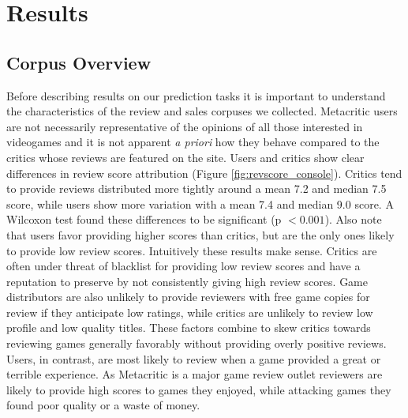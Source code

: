 \documentclass[letterpaper]{article}
\begin{document}


\section{Results}

\subsection{Corpus Overview}
Before describing results on our prediction tasks it is important to understand the characteristics of the review and sales corpuses we collected. Metacritic users are not necessarily representative of the opinions of all those interested in videogames and it is not apparent \textit{a priori} how they behave compared to the critics whose reviews are featured on the site.
Users and critics show clear differences in review score attribution (Figure \ref{fig:revscore_console}). Critics tend to provide reviews distributed more tightly around a mean 7.2 and median 7.5 score, while users show more variation with a mean 7.4 and median 9.0 score. A Wilcoxon test found these differences to be significant (p $< 0.001$). Also note that users favor providing higher scores than critics, but are the only ones likely to provide low review scores.
Intuitively these results make sense. Critics are often under threat of blacklist for providing low review scores and have a reputation to preserve by not consistently giving high review scores. Game distributors are also unlikely to provide reviewers with free game copies for review if they anticipate low ratings, while critics are unlikely to review low profile and low quality titles. These factors combine to skew critics towards reviewing games generally favorably without providing overly positive reviews. Users, in contrast, are most likely to review when a game provided a great or terrible experience. As Metacritic is a major game review outlet reviewers are likely to provide high scores to games they enjoyed, while attacking games they found poor quality or a waste of money.
\end{document}
